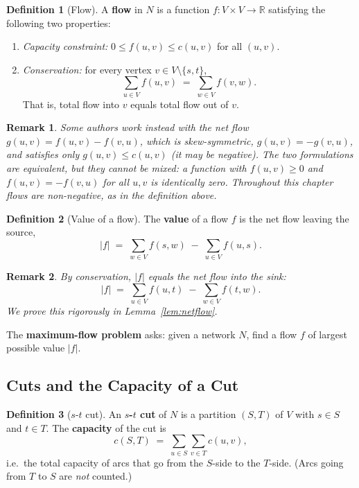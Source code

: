 \documentclass{article}
\newtheorem{remark}{Remark}
\theoremstyle{definition}
\newtheorem{definition}{Definition}
\begin{document}
\begin{definition}[Flow]
A \textbf{flow} in $N$ is a function $f : V \times V \to \mathbb{R}$
satisfying the following two properties:
\begin{enumerate}
  \item \emph{Capacity constraint:} $0 \le f(u, v) \le c(u, v)$ for
        all $(u, v)$.
  \item \emph{Conservation:} for every vertex $v \in V \setminus \{s, t\}$,
        \[
          \sum_{u \in V} f(u, v) \;=\; \sum_{w \in V} f(v, w).
        \]
        That is, total flow into $v$ equals total flow out of $v$.
\end{enumerate}
\end{definition}

\begin{remark}
Some authors work instead with the \emph{net flow}
$g(u, v) = f(u, v) - f(v, u)$, which is skew-symmetric,
$g(u, v) = -g(v, u)$, and satisfies only $g(u, v) \le c(u, v)$ (it may be
negative). The two formulations are equivalent, but they cannot be mixed:
a function with $f(u, v) \ge 0$ and $f(u, v) = -f(v, u)$ for all $u, v$ is
identically zero. Throughout this chapter flows are non-negative, as in
the definition above.
\end{remark}

\begin{definition}[Value of a flow]
The \textbf{value} of a flow $f$ is the net flow leaving the source,
\[
  |f| \;=\; \sum_{w \in V} f(s, w) \;-\; \sum_{u \in V} f(u, s).
\]
\end{definition}

\begin{remark}
By conservation, $|f|$ equals the net flow \emph{into} the sink:
\[
  |f| \;=\; \sum_{u \in V} f(u, t) \;-\; \sum_{w \in V} f(t, w).
\]
We prove this rigorously in Lemma~\ref{lem:netflow}.
\end{remark}

The \textbf{maximum-flow problem} asks: given a network $N$, find a
flow $f$ of largest possible value $|f|$.

\subsection{Cuts and the Capacity of a Cut}

\begin{definition}[$s$-$t$ cut]
An \textbf{$s$-$t$ cut} of $N$ is a partition $(S, T)$ of $V$ with
$s \in S$ and $t \in T$. The \textbf{capacity} of the cut is
\[
  c(S, T) \;=\; \sum_{u \in S} \sum_{v \in T} c(u, v),
\]
i.e.\ the total capacity of arcs that go from the $S$-side to the
$T$-side. (Arcs going from $T$ to $S$ are \emph{not} counted.)
\end{definition}
\end{document}

